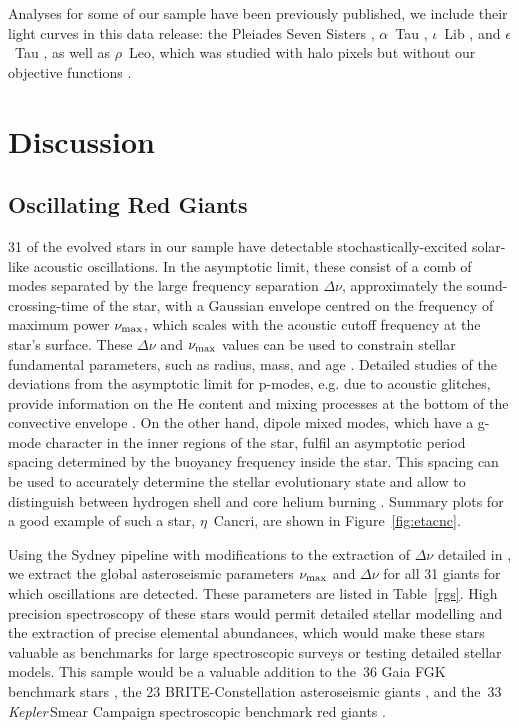 \documentclass[modern]{aastex62}
\newcommand{\numax}{\mbox{$\nu_{\rm max}$}\xspace}
\newcommand{\Dnu}{\mbox{$\Delta \nu$}\xspace}
\newcommand\kepler{\emph{Kepler}\,}
\begin{document}


Analyses for some of our sample have been previously published, we include their light curves in this data release: the Pleiades Seven Sisters \citep{White2017}, $\alpha$~Tau \citep[Aldebaran;][]{Farr2018}, $\iota$~Lib \citep{Buysschaert2018}, and $\epsilon$~Tau \citep{Arentoft2019}, as well as $\rho$~Leo, which was studied with halo pixels but without our objective functions \citep{Aerts2018}.

\section{Discussion}
\label{sec:discussion}

\subsection{Oscillating Red Giants}
\label{sec:rgs}
31 of the evolved stars in our sample have detectable stochastically-excited solar-like acoustic oscillations. In the asymptotic limit, these consist of a comb of modes separated by the large frequency separation \Dnu, approximately the sound-crossing-time of the star, with a Gaussian envelope centred on the frequency of maximum power \numax, which scales with the acoustic cutoff frequency at the star's surface. 
These \Dnu and \numax values can be used to constrain stellar fundamental parameters, such as radius, mass, and age \citep[e.g.][, for a recent review]{2017A&ARv..25....1H}. Detailed studies of the deviations from the asymptotic limit for p-modes, e.g. due to acoustic glitches, provide information on the He content and mixing processes at the bottom of the convective envelope \citep[e.g. ][]{Verma2019}. On the other hand, dipole mixed modes, which have a g-mode character in the inner regions of the star, fulfil an asymptotic period spacing determined by the buoyancy frequency inside the star. This spacing can be used to accurately determine the stellar evolutionary state and allow to distinguish between hydrogen shell and core helium burning \citep{bedding2011}. 
Summary plots for a good example of such a star, $\eta$~Cancri, are shown in Figure~\ref{fig:etacnc}.

Using the Sydney pipeline \citep{Huber2009} with modifications to the extraction of \Dnu detailed in \citep{Yu2018}, we extract the global asteroseismic parameters \numax and \Dnu for all 31 giants for which oscillations are detected. These parameters are listed in Table~\ref{rgs}. High precision spectroscopy of these stars would permit detailed stellar modelling and the extraction of precise elemental abundances, which would make these stars valuable as benchmarks for large spectroscopic surveys or testing detailed stellar models. This sample would be a valuable addition to the~36 Gaia FGK benchmark stars \citep{gaiabenchmark1,gaiabenchmark3,2018RNAAS...2c.152J}, the 23 BRITE-Constellation asteroseismic giants \citep{Kallinger2019}, and the~33 \kepler Smear Campaign spectroscopic benchmark red giants \citep{smearcampaign}. 
\end{document}
